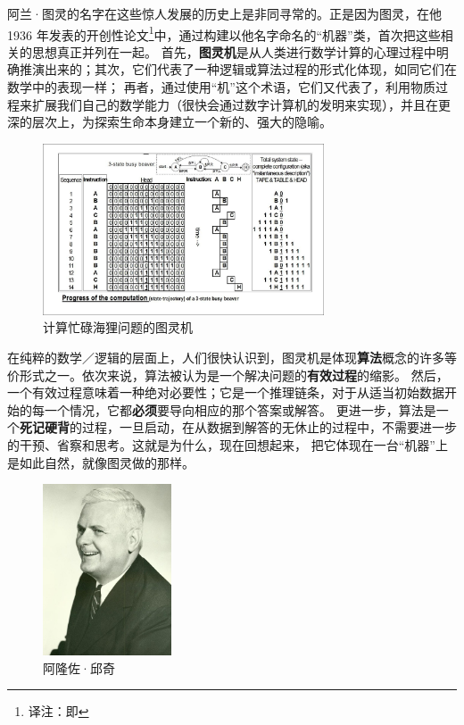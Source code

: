 \documentclass[a4paper,12pt]{article}
\begin{document}
阿兰·图灵的名字在这些惊人发展的历史上是非同寻常的。正是因为图灵，在他 1936 年发表的开创性论文\footnote[3]{译注：即\cite{TuringA1937}}中，通过构建以他名字命名的“机器”类，首次把这些相关的思想真正并列在一起。
首先，\textbf{\gls{图灵机}}是从人类进行数学计算的心理过程中明确推演出来的；其次，它们代表了一种逻辑或算法过程的\gls{形式化}体现，如同它们在数学中的表现一样；
再者，通过使用“机”这个术语，它们又代表了，利用\gls{物质过程}来扩展我们自己的数学能力（很快会通过\gls{数字计算机}的发明来实现），并且在更深的层次上，为探索生命本身建立一个新的、强大的隐喻。

\begin{figure}[ht]
\centering
\includegraphics[height=2.0in]{images/turing_machine.jpg}
\caption{计算忙碌海狸问题的图灵机}
\end{figure}

在纯粹的数学／逻辑的层面上，人们很快认识到，图灵机是体现\textbf{\gls{算法}}概念的许多等价形式之一。依次来说，\gls{算法}被认为是一个解决问题的\textbf{\gls{有效过程}}的缩影。
然后，一个有效过程意味着一种绝对必要性；它是一个\gls{推理链条}，对于从适当初始数据开始的每一个情况，它都\textbf{必须}要导向相应的那个答案或解答。
更进一步，算法是一个\textbf{死记硬背}的过程，一旦启动，在从数据到解答的无休止的过程中，不需要进一步的干预、省察和思考。这就是为什么，现在回想起来，
把它体现在一台“机器”上是如此自然，就像图灵做的那样。

\begin{figure}
  \begin{center}
    \includegraphics[height=2.0in]{images/alonzo_church.jpg}
  \end{center}
  \caption{阿隆佐·邱奇}
\end{figure}
\end{document}
